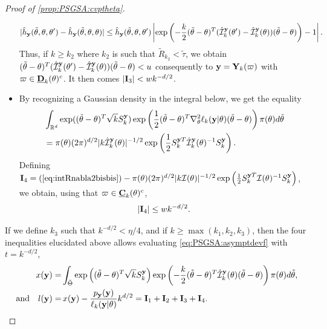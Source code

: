 \begin{proof}[Proof of \cref{prop:PSGSA:cvptheta}]
\begin{itemize}
            \begin{align}   
                 |\hat h_{\mathbf{y}}(\tilde\theta,\theta,\theta') - \hat h_{\mathbf{y}}(\tilde\theta,\theta,\theta) | 
                    \leq \hat h_{\mathbf{y}}(\tilde\theta,\theta,\theta')\left|\exp\left( -\frac{k}{2}(\tilde\theta-\theta)^T(\hat{\mathcal{I}}_k^{\mathbf{y}}(\theta')-\hat{\mathcal{I}}_k^{\mathbf{y}}(\theta))(\tilde\theta-\theta) \right)-1\right|.
            \end{align}
        Thus, if $k\geq k_2$ where $k_2$ is such that $\tilde R_{k_2}<\tilde\tau$, we obtain $(\tilde\theta-\theta)^T(\hat{\mathcal{I}}_k^{\mathbf{y}}(\theta')-\hat{\mathcal{I}}_k^{\mathbf{y}}(\theta))(\tilde\theta-\theta) < u$ consequently to $\mathbf{y}=\mathbf{Y}_k(\varpi)$ with $\varpi\in\underline{\mathbf{D}}_k(\theta)^c$. 
        It then comes $|\mathbf{I}_3|< w k^{-d/2}$.

        \item  By recognizing a Gaussian density in the integral below, we get the equality 
        \begin{align}
        \nonumber
            &\int_{\mathbb{R}^d}\exp((\tilde\theta-\theta)^T\sqrt{k}S_k^{\mathbf{y}})\exp\left(\frac{1}{2}(\tilde\theta-\theta)^T\nabla_\theta^2\ell_k(\mathbf{y}|\theta)(\tilde\theta-\theta)\right)\pi(\theta)d\tilde\theta \\
            &=
            \pi(\theta)(2\pi)^{d/2}|k\hat{\mathcal{I}}_k^{\mathbf{y}}(\theta)|^{-1/2}\exp\left(\frac{1}{2}S_k^{\mathbf{y} T}\hat{\mathcal{I}}_k^{\mathbf{y}}(\theta)^{-1}S_k^{\mathbf{y}}\right).
            \label{eq:intRnabla2bisbis}
        \end{align}
        Defining $\mathbf{I}_4= (\ref{eq:intRnabla2bisbis}) - \pi(\theta)(2\pi)^{d/2}|k\mathcal{I}(\theta)|^{-1/2}\exp\left(\frac{1}{2}S_k^{\mathbf{y}T}\mathcal{I}(\theta)^{-1}S_k^{\mathbf{y}}\right)$, we obtain,
        using that $\varpi\in \underline{\mathbf{C}}_k(\theta)^c$, 
        \begin{equation}
            |\mbf I_4|  %
            \leq w k^{-d/2}.
        \end{equation}
    \end{itemize}

If we define $k_3$ such that $k^{-d/2}<\eta/4$, and if $k\geq\max(k_1,k_2,k_3)$, then the four inequalities elucidated above allows evaluating \cref{eq:PSGSA:asymptdevf} with $t=k^{-d/2}$,
\begin{equation}
    \begin{aligned}
    x(\mathbf{y}) = & \int_{\tilde\Theta} \exp\left((\tilde\theta-\theta)^T\sqrt{k}S_k^{\mathbf{y}}\right)\exp\left( -\frac{k}{2}(\tilde\theta-\theta)^T\hat{\mathcal{I}}_k^{\mathbf{y}}(\theta)(\tilde\theta-\theta) \right)\pi(\theta )d\tilde\theta,\\
        \text{and}\quad l(\mathbf{y}) =&\, x(\mathbf{y})-\frac{p_{\mathbf{y}}(\mathbf{y})}{\ell_k(\mathbf{y}|\theta)}k^{d/2} = \mathbf{I}_1+\mathbf{I}_2+\mathbf{I}_3+\mathbf{I}_4.
    \end{aligned}
\end{equation}


\end{proof}
